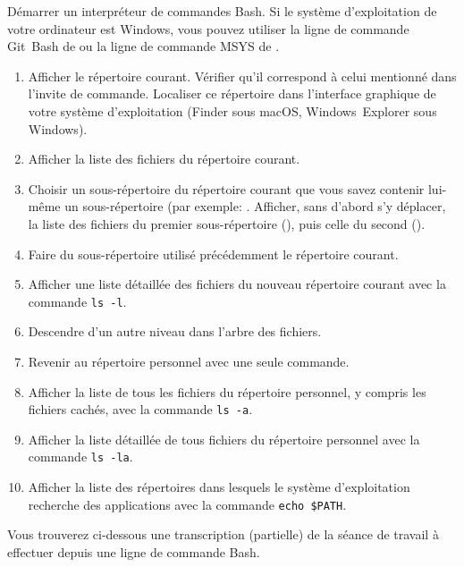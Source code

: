 \begin{exercice}
  Démarrer un interpréteur de commandes Bash. Si le système
  d'exploitation de votre ordinateur est Windows, vous pouvez utiliser
  la ligne de commande Git~Bash de
   ou la
  ligne de commande MSYS de
  .
  \begin{enumerate}
  \item Afficher le répertoire courant. Vérifier qu'il correspond à
    celui mentionné dans l'invite de commande. Localiser ce répertoire
    dans l'interface graphique de votre système d'exploitation (Finder
    sous macOS, Windows~Explorer sous Windows).
  \item Afficher la liste des fichiers du répertoire courant.
  \item Choisir un sous-répertoire du répertoire courant que vous
    savez contenir lui-même un sous-répertoire (par exemple:
    . Afficher, sans d'abord s'y déplacer, la
    liste des fichiers du premier sous-répertoire (),
    puis celle du second ().
  \item Faire du sous-répertoire utilisé précédemment le répertoire
    courant.
  \item Afficher une liste détaillée des fichiers du nouveau
    répertoire courant avec la commande \verb=ls -l=.
  \item Descendre d'un autre niveau dans l'arbre des fichiers.
  \item Revenir au répertoire personnel avec une seule commande.
  \item Afficher la liste de tous les fichiers du répertoire
    personnel, y compris les fichiers cachés, avec la commande
    \verb=ls -a=.
  \item Afficher la liste détaillée de tous fichiers du répertoire
    personnel avec la commande \verb=ls -la=.
  \item Afficher la liste des répertoires dans lesquels le système
    d'exploitation recherche des applications avec la commande
    \verb=echo $PATH=.
  \end{enumerate}
  \begin{sol}
    Vous trouverez ci-dessous une transcription (partielle) de la
    séance de travail à effectuer depuis une ligne de commande Bash.
    \begin{Schunk}
\begin{Verbatim}[commandchars=\\\{\}]

\end{Verbatim}
\end{Schunk}
\end{sol}
\end{exercice}
